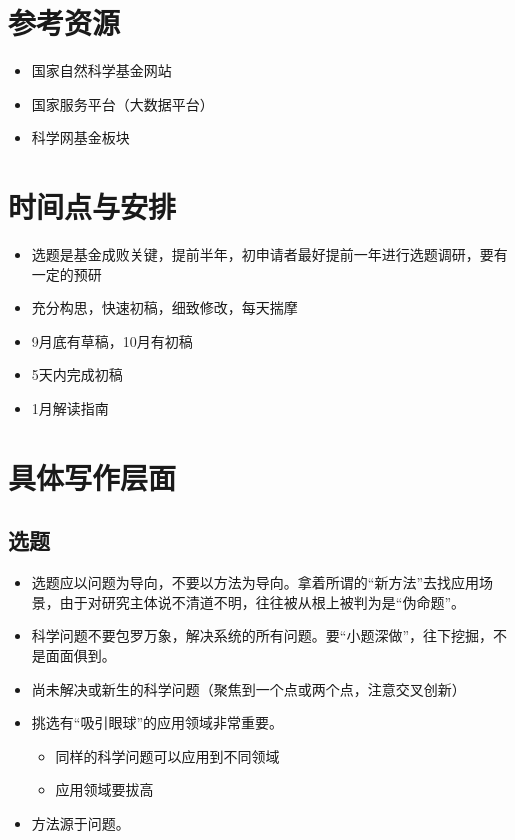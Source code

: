 \section{参考资源}
\begin{itemize}
\item 国家自然科学基金网站
\item 国家服务平台（大数据平台）
\item 科学网基金板块
\end{itemize}


\section{时间点与安排}
\begin{itemize}
\item 选题是基金成败关键，提前半年，初申请者最好提前一年进行选题调研，要有一定的预研
\item 充分构思，快速初稿，细致修改，每天揣摩
\item 9月底有草稿，10月有初稿
\item 5天内完成初稿
\item 1月解读指南
\end{itemize}



\section{具体写作层面}
\subsection{选题}
\begin{itemize}
\item 选题应以问题为导向，不要以方法为导向。拿着所谓的“新方法”去找应用场景，由于对研究主体说不清道不明，往往被从根上被判为是“伪命题”。

\item 科学问题不要包罗万象，解决系统的所有问题。要“小题深做”，往下挖掘，不是面面俱到。

\item 尚未解决或新生的科学问题（聚焦到一个点或两个点，注意交叉创新）

\item 挑选有“吸引眼球”的应用领域非常重要。
	\begin{itemize}
	\item 同样的科学问题可以应用到不同领域
	\item 应用领域要拔高
	\end{itemize}
\item 方法源于问题。
\end{itemize}



